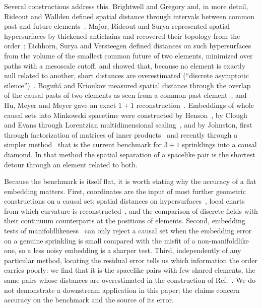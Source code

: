 \documentclass[prd,twocolumn,superscriptaddress,nofootinbib,amsmath,amssymb,floatfix]{revtex4-2}
\begin{document}
Several constructions address this. Brightwell and Gregory and, in more detail, Rideout and Wallden defined spatial distance through intervals between common past and future elements~\cite{BrightwellGregory91,RideoutWallden09}. Major, Rideout and Surya represented spatial hypersurfaces by thickened antichains and recovered their topology from the order~\cite{MRS06,MRS07}; Eichhorn, Surya and Versteegen defined distances on such hypersurfaces from the volume of the smallest common future of two elements, minimized over paths with a mesoscale cutoff, and showed that, because no element is exactly null related to another, short distances are overestimated (``discrete asymptotic silence'')~\cite{ESV19}. Bogu\~n\'a and Krioukov measured spatial distance through the overlap of the causal pasts of two elements as seen from a common past element~\cite{BK24}, and Hu, Meyer and Meyer gave an exact $1+1$ reconstruction~\cite{HMM25}. Embeddings of whole causal sets into Minkowski spacetime were constructed by Henson~\cite{Henson06}, by Clough and Evans through Lorentzian multidimensional scaling~\cite{CloughEvans16}, and by Johnston, first through factorization of matrices of inner products~\cite{Johnston22} and recently through a simpler method~\cite{Johnston25} that is the current benchmark for $3+1$ sprinklings into a causal diamond. In that method the spatial separation of a spacelike pair is the shortest detour through an element related to both.

Because the benchmark is itself flat, it is worth stating why the accuracy of a flat embedding matters. First, coordinates are the input of most further geometric constructions on a causal set: spatial distances on hypersurfaces~\cite{ESV19}, local charts from which curvature is reconstructed~\cite{Madsen26}, and the comparison of discrete fields with their continuum counterparts at the positions of elements. Second, embedding tests of manifoldlikeness~\cite{CloughEvans16,Toolkit} can only reject a causal set when the embedding error on a genuine sprinkling is small compared with the misfit of a non-manifoldlike one, so a less noisy embedding is a sharper test. Third, independently of any particular method, locating the residual error tells us which information the order carries poorly: we find that it is the spacelike pairs with few shared elements, the same pairs whose distances are overestimated in the construction of Ref.~\cite{ESV19}. We do not demonstrate a downstream application in this paper; the claims concern accuracy on the benchmark and the source of its error.
\end{document}
